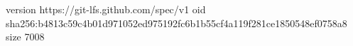 version https://git-lfs.github.com/spec/v1
oid sha256:b4813c59c4b01d971052ed975192fc6b1b55cf4a119f281ce1850548ef0758a8
size 7008
